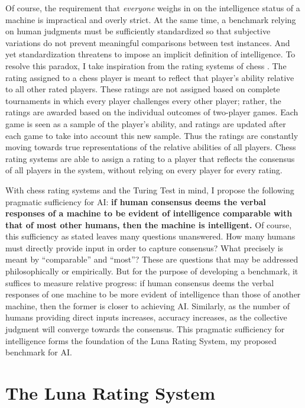 Of course, the requirement that \textit{everyone} weighs in on the intelligence status of a machine is impractical and overly strict. At the same time, a benchmark relying on human judgments must be sufficiently standardized so that subjective variations do not prevent meaningful comparisons between test instances. And yet standardization threatens to impose an implicit definition of intelligence. To resolve this paradox, I take inspiration from the rating systems of chess \citep{glickman1995chess}. The rating assigned to a chess player is meant to reflect that player's ability relative to all other rated players. These ratings are not assigned based on complete tournaments in which every player challenges every other player; rather, the ratings are awarded based on the individual outcomes of two-player games. Each game is seen as a sample of the player's ability, and ratings are updated after each game to take into account this new sample. Thus the ratings are constantly moving towards true representations of the relative abilities of all players. Chess rating systems are able to assign a rating to a player that reflects the consensus of all players in the system, without relying on every player for every rating.

With chess rating systems and the Turing Test in mind, I propose the following pragmatic sufficiency for AI: \textbf{if human consensus deems the verbal responses of a machine to be evident of intelligence comparable with that of most other humans, then the machine is intelligent.}  Of course, this sufficiency as stated leaves many questions unanswered. How many humans must directly provide input in order to capture consensus? What precisely is meant by ``comparable'' and ``most''? These are questions that may be addressed philosophically or empirically. But for the purpose of developing a benchmark, it suffices to measure relative progress: if human consensus deems the verbal responses of one machine to be more evident of intelligence than those of another machine, then the former is closer to achieving AI. Similarly, as the number of humans providing direct inputs increases, accuracy increases, as the collective judgment will converge towards the consensus. This pragmatic sufficiency for intelligence forms the foundation of the Luna Rating System, my proposed benchmark for AI.

\section{The Luna Rating System}

